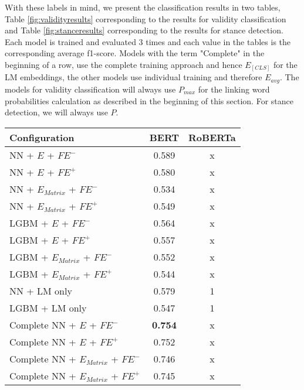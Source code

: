 With these labels in mind, we present the classification results in two tables, Table \ref{fig:validityresults} corresponding to the results for validity classification and Table \ref{fig:stanceresults} corresponding to the results for stance detection. Each model is trained and evaluated $3$ times and each value in the tables is the corresponding average f1-score. Models with the term "Complete" in the beginning of a row, use the complete training approach and hence $E_{[CLS]}$ for the LM embeddings, the other models use individual training and therefore $E_{avg}$. The models for validity classification will always use $P_{max}$ for the linking word probabilities calculation as described in the beginning of this section. For stance detection, we will always use $P$. \\

\begin{table}[h]
  	\tiny
  	\centering
	\begin{subtable}{.5\textwidth}
		\centering
  		\renewcommand{\arraystretch}{1.4}
   		\begin{tabular}{|| l || c | c ||}
   			\hline
   			{Configuration} & {BERT} & {RoBERTa} \\
   			\hline\hline
   			NN + $E$ + $\textit{FE}^-$ &  0.589 & x \\
 			\hline
 			NN + $E$ + $\textit{FE}^+$ & 0.580 & x \\
 			\hline
 			NN + $E_{Matrix}$ + $\textit{FE}^-$ & 0.534 & x \\
 			\hline
 			NN + $E_{Matrix}$ + $\textit{FE}^+$ & 0.549 & x \\
 			\hline
 			LGBM + $E$ + $\textit{FE}^-$ & 0.564 & x \\
 			\hline
 			LGBM + $E$ + $\textit{FE}^+$ & 0.557 & x \\
 			\hline
 			LGBM + $E_{Matrix}$ + $\textit{FE}^-$ & 0.552 & x \\
 			\hline
 			LGBM + $E_{Matrix}$ + $\textit{FE}^+$ & 0.544 & x \\
 			\hline
 			NN + LM only & 0.579 & 1 \\
 			\hline
 			LGBM + LM only & 0.547 & 1 \\
 			\hline
 			Complete NN + $E$ + $\textit{FE}^-$ & \textbf{0.754} & x \\
 			\hline
 			Complete NN + $E$ + $\textit{FE}^+$ & 0.752 & x \\
 			\hline
 			Complete NN + $E_{Matrix}$ + $\textit{FE}^-$ & 0.746 & x \\
 			\hline
 			Complete NN + $E_{Matrix}$ + $\textit{FE}^+$ & 0.745 & x \\

\end{tabular}
\end{subtable}
\end{table}
